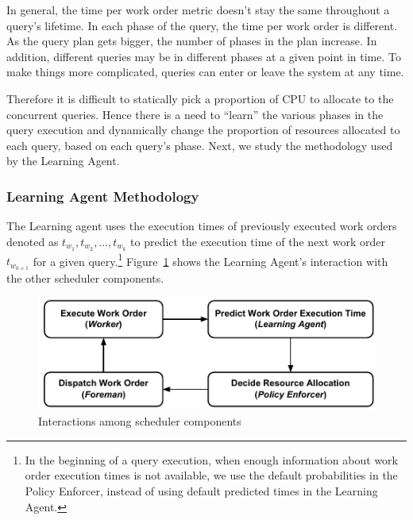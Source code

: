 In general, the time per work order metric doesn't stay the same throughout a query's lifetime.
In each phase of the query, the time per work order is different.
As the query plan gets bigger, the number of phases in the plan increase.
In addition, different queries may be in different phases at a given point in time.
To make things more complicated, queries can enter or leave the system at any time.


Therefore it is difficult to statically pick a proportion of CPU to allocate to the concurrent queries. 
Hence there is a need to ``learn'' the various phases in the query execution and dynamically change the proportion of resources allocated to each query, based on each query's phase.
Next, we study the methodology used by the Learning Agent.
\subsubsection{Learning Agent Methodology}
The Learning agent uses the execution times of previously executed work orders 
denoted as $t_{w_{1}}, t_{w_{2}}, \ldots, t_{w_{k}}$ to predict the execution time of 
the next work order $t_{w_{k+1}}$ for a given query.\footnote{In the beginning of a query execution, when enough information about work order execution times is not available, we use the default probabilities in the Policy Enforcer, instead of using default predicted times in the Learning Agent.}
Figure~\ref{fig:scheduler-cycle} shows the Learning Agent's interaction with the other scheduler components.

\begin{figure}[h]
	\centering
	\includegraphics[width=\linewidth]{figures/Compact-SchedulerCycle.pdf}
	\vspace{-2em}
	\caption{Interactions among scheduler components}
	\label{fig:scheduler-cycle}
\end{figure}

